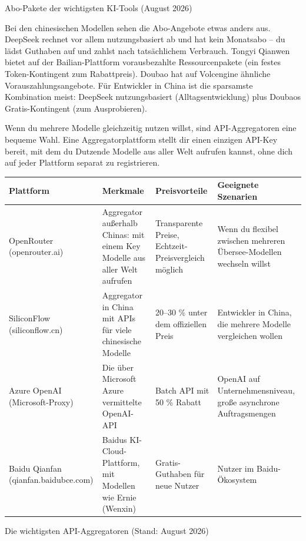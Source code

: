 \begin{center}\small\color{gray}Abo-Pakete der wichtigsten KI-Tools (August 2026)\end{center}

Bei den chinesischen Modellen sehen die Abo-Angebote etwas anders aus. DeepSeek rechnet vor allem nutzungsbasiert ab und hat kein Monatsabo – du lädst Guthaben auf und zahlst nach tatsächlichem Verbrauch. Tongyi Qianwen bietet auf der Bailian-Plattform vorausbezahlte Ressourcenpakete (ein festes Token-Kontingent zum Rabattpreis). Doubao hat auf Volcengine ähnliche Vorauszahlungsangebote. Für Entwickler in China ist die sparsamste Kombination meist: DeepSeek nutzungsbasiert (Alltagsentwicklung) plus Doubaos Gratis-Kontingent (zum Ausprobieren).


Wenn du mehrere Modelle gleichzeitig nutzen willst, sind API-Aggregatoren eine bequeme Wahl. Eine Aggregatorplattform stellt dir einen einzigen API-Key bereit, mit dem du Dutzende Modelle aus aller Welt aufrufen kannst, ohne dich auf jeder Plattform separat zu registrieren.

\begin{center}
\begin{tabularx}{\linewidth}{|X|X|X|X|}
\hline
\textbf{Plattform} & \textbf{Merkmale} & \textbf{Preisvorteile} & \textbf{Geeignete Szenarien} \tabularnewline
\hline
OpenRouter (openrouter.ai) & Aggregator außerhalb Chinas: mit einem Key Modelle aus aller Welt aufrufen & Transparente Preise, Echtzeit-Preisvergleich möglich & Wenn du flexibel zwischen mehreren Übersee-Modellen wechseln willst \tabularnewline
SiliconFlow (siliconflow.cn) & Aggregator in China mit APIs für viele chinesische Modelle & 20–30 \% unter dem offiziellen Preis & Entwickler in China, die mehrere Modelle vergleichen wollen \tabularnewline
Azure OpenAI (Microsoft-Proxy) & Die über Microsoft Azure vermittelte OpenAI-API & Batch API mit 50 \% Rabatt & OpenAI auf Unternehmensniveau, große asynchrone Auftragsmengen \tabularnewline
Baidu Qianfan (qianfan.baidubce.com) & Baidus KI-Cloud-Plattform, mit Modellen wie Ernie (Wenxin) & Gratis-Guthaben für neue Nutzer & Nutzer im Baidu-Ökosystem \tabularnewline
\hline
\end{tabularx}
\end{center}

\begin{center}\small\color{gray}Die wichtigsten API-Aggregatoren (Stand: August 2026)\end{center}

